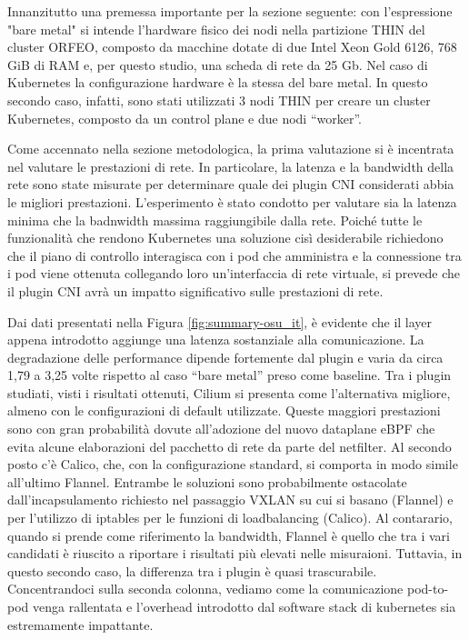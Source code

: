 Innanzitutto una premessa importante per la sezione seguente: con l'espressione
"bare metal" si intende l'hardware fisico dei nodi nella partizione THIN del
cluster ORFEO, composto da macchine dotate di due Intel Xeon Gold 6126, 768 GiB
di RAM e, per questo studio, una scheda di rete da 25 Gb. Nel caso di Kubernetes
la configurazione hardware è la stessa del bare metal.
In questo secondo caso, infatti, sono stati utilizzati 3 nodi THIN per creare un
cluster Kubernetes, composto da un control plane e due nodi ``worker''.

Come accennato nella sezione metodologica, la prima valutazione si è incentrata
nel valutare le prestazioni di rete.
In particolare, la latenza e la bandwidth della rete sono state misurate per
determinare quale dei plugin CNI considerati abbia le migliori prestazioni.
L'esperimento è stato condotto per valutare sia la latenza minima che la
badnwidth massima raggiungibile dalla rete.
Poiché tutte le funzionalità che rendono Kubernetes una soluzione cisì
desiderabile richiedono che il piano di controllo interagisca con i pod che
amministra e la connessione tra i pod viene ottenuta collegando loro
un'interfaccia di rete virtuale, si prevede che il plugin CNI avrà un impatto
significativo sulle prestazioni di rete.

Dai dati presentati nella Figura \ref{fig:summary-osu_it}, è evidente che il
layer appena introdotto aggiunge una latenza sostanziale alla comunicazione.
La degradazione delle performance dipende fortemente dal plugin e varia da circa
1,79 a 3,25 volte rispetto al caso ``bare metal'' preso come baseline.
Tra i plugin studiati, visti i risultati ottenuti, Cilium si presenta come
l'alternativa migliore, almeno con le configurazioni di default utilizzate.
Queste maggiori prestazioni sono con gran probabilità dovute all'adozione del
nuovo dataplane eBPF che evita alcune elaborazioni del pacchetto di rete da
parte del netfilter.
 Al secondo posto c'è Calico, che, con la configurazione standard,
si comporta in modo simile all'ultimo Flannel.
Entrambe le soluzioni sono probabilmente ostacolate dall'incapsulamento richiesto nel
passaggio VXLAN su cui si basano (Flannel) e per l'utilizzo di iptables per le
funzioni di loadbalancing (Calico).
Al contarario, quando si prende come riferimento la bandwidth, Flannel è quello
che tra i vari candidati è riuscito a riportare i risultati più elevati nelle
misuraioni.
Tuttavia, in questo secondo caso, la differenza tra i plugin è
quasi trascurabile.
Concentrandoci sulla seconda colonna, vediamo come la comunicazione pod-to-pod
venga rallentata e l'overhead introdotto dal software stack di kubernetes sia
estremamente impattante.

